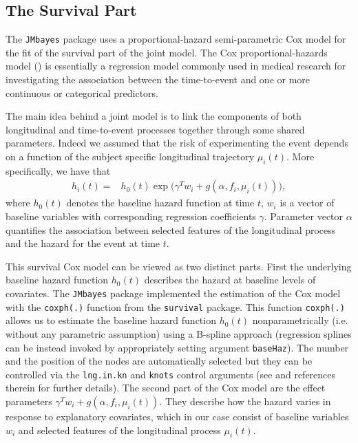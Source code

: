 \documentclass[12pt]{article}
\begin{document}
\subsection{The Survival Part}
\label{Survival submodels}

The \texttt{JMbayes} package uses a proportional-hazard semi-parametric Cox model for the fit of the survival part of the joint model. The Cox proportional-hazards model (\cite{cox1972}) is essentially a regression model commonly used in medical research for investigating the association between the time-to-event and one or more continuous or categorical predictors.

The main idea behind a joint model is to link the components of both longitudinal and time-to-event processes together through some shared parameters.
Indeed we assumed that the risk of experimenting the event depends on a function of the subject specific longitudinal trajectory $\mu_i(t)$. More specifically, we have that
\begin{equation}
\begin{split}
h_i(t) = &h_0 (t) \exp \big(\gamma^T w_i +g(\alpha, f_i, \mu_i(t))\big),
\end{split}
\label{Survival model1}
\end{equation}
where $h_0 (t)$ denotes the baseline hazard function at time $t$, $w_i$ is a vector of baseline variables with corresponding regression coefficients $\gamma$. Parameter vector $\alpha$ quantifies the association between selected features of the longitudinal process and the hazard for the event at time $t$.

This survival Cox model can be viewed as two distinct parts. First the underlying baseline hazard function $h_0 (t)$ describes the hazard at baseline levels of covariates. The \texttt{JMbayes} package implemented the estimation of the Cox model with the \texttt{coxph(.)} function from the \texttt{survival} package. This function \texttt{coxph(.)} allows us to estimate the baseline hazard function $h_0 (t)$ nonparametrically (i.e. without any parametric assumption) using a B-spline approach (regression splines can be instead invoked by appropriately setting argument \texttt{baseHaz}). The number and the position of the nodes are automatically selected but they can be controlled via the \texttt{lng.in.kn} and \texttt{knots} control arguments (see \cite{JMbayes} and references therein for further details). The second part of the Cox model are the effect parameters $\gamma^T w_i +g(\alpha, f_i, \mu_i(t))$. They describe how the hazard varies in response to explanatory covariates, which in our case consist of baseline variables $w_i$ and selected features of the longitudinal process $\mu_i(t)$.
\end{document}
